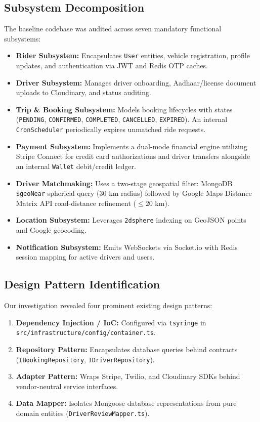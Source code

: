 \documentclass[conference]{IEEEtran}
\begin{document}
\subsection{Subsystem Decomposition}
The baseline codebase was audited across seven mandatory functional subsystems:
\begin{itemize}
    \item \textbf{Rider Subsystem:} Encapsulates \texttt{User} entities, vehicle registration, profile updates, and authentication via JWT and Redis OTP caches.
    \item \textbf{Driver Subsystem:} Manages driver onboarding, Aadhaar/license document uploads to Cloudinary, and status auditing.
    \item \textbf{Trip \& Booking Subsystem:} Models booking lifecycles with states (\texttt{PENDING}, \texttt{CONFIRMED}, \texttt{COMPLETED}, \texttt{CANCELLED}, \texttt{EXPIRED}). An internal \texttt{CronScheduler} periodically expires unmatched ride requests.
    \item \textbf{Payment Subsystem:} Implements a dual-mode financial engine utilizing Stripe Connect for credit card authorizations and driver transfers alongside an internal \texttt{Wallet} debit/credit ledger.
    \item \textbf{Driver Matchmaking:} Uses a two-stage geospatial filter: MongoDB \texttt{\$geoNear} spherical query ($30\text{ km}$ radius) followed by Google Maps Distance Matrix API road-distance refinement ($\le 20\text{ km}$).
    \item \textbf{Location Subsystem:} Leverages \texttt{2dsphere} indexing on GeoJSON points and Google geocoding.
    \item \textbf{Notification Subsystem:} Emits WebSockets via Socket.io with Redis session mapping for active drivers and users.
\end{itemize}

\subsection{Design Pattern Identification}
Our investigation revealed four prominent existing design patterns:
\begin{enumerate}
    \item \textbf{Dependency Injection / IoC:} Configured via \texttt{tsyringe} in \texttt{src/infrastructure/config/container.ts}.
    \item \textbf{Repository Pattern:} Encapsulates database queries behind contracts (\texttt{IBookingRepository}, \texttt{IDriverRepository}).
    \item \textbf{Adapter Pattern:} Wraps Stripe, Twilio, and Cloudinary SDKs behind vendor-neutral service interfaces.
    \item \textbf{Data Mapper:} Isolates Mongoose database representations from pure domain entities (\texttt{DriverReviewMapper.ts}).
\end{enumerate}
\end{document}
